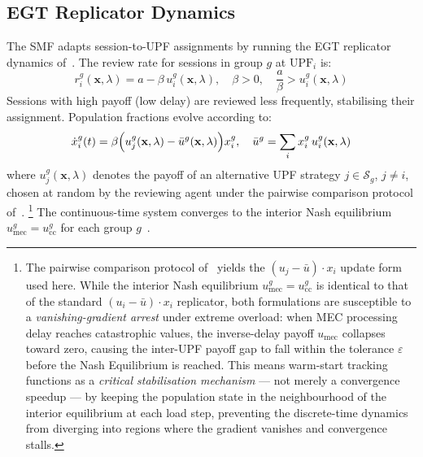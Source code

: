 \documentclass[conference]{IEEEtran}
\begin{document}
\subsection{EGT Replicator Dynamics}
\label{sec:egt}

The SMF adapts session-to-UPF assignments by running the
EGT replicator dynamics of~\cite{Alevizaki2021upf}.
The review rate for sessions in group $g$ at
$\text{UPF}_i$ is:
\begin{equation}
    r_i^g(\mathbf{x},\lambda) =
    a - \beta\,u_i^g(\mathbf{x},\lambda),
    \quad \beta > 0,\quad
    \frac{a}{\beta} > u_i^g(\mathbf{x},\lambda)
    \label{eq:revrate}
\end{equation}
Sessions with high payoff (low delay) are reviewed less
frequently, stabilising their assignment. Population
fractions evolve according to:
\begin{equation}
    \dot{x}_i^g(t) = \beta\Bigl(u_j^g(\mathbf{x},\lambda)
    - \bar{u}^g(\mathbf{x},\lambda)\Bigr)x_i^g, \quad
    \bar{u}^g = \sum_i x_i^g\,u_i^g(\mathbf{x},\lambda)
    \label{eq:replicator}
\end{equation}
where $u_j^g(\mathbf{x},\lambda)$ denotes the payoff of
an alternative UPF strategy $j \in \mathcal{S}_g$,
$j \neq i$, chosen at random by the reviewing agent
under the pairwise comparison protocol
of~\cite{Alevizaki2021upf}.
\footnote{The pairwise comparison protocol of~\cite{Alevizaki2021upf}
yields the $(u_j - \bar{u})\cdot x_i$ update form used here.
While the interior Nash equilibrium $u_\text{mec}^g = u_\text{cc}^g$
is identical to that of the standard $(u_i - \bar{u})\cdot x_i$
replicator, both formulations are susceptible to a
\emph{vanishing-gradient arrest} under extreme overload: when MEC
processing delay reaches catastrophic values, the inverse-delay
payoff $u_\text{mec}$ collapses toward zero, causing the inter-UPF
payoff gap to fall within the tolerance $\varepsilon$ before the
Nash Equilibrium is reached. This means warm-start tracking
functions as a \emph{critical stabilisation mechanism} --- not
merely a convergence speedup --- by keeping the population state
in the neighbourhood of the interior equilibrium at each load
step, preventing the discrete-time dynamics from diverging into
regions where the gradient vanishes and convergence stalls.}
The continuous-time system converges to the interior
Nash equilibrium $u_\text{mec}^g = u_\text{cc}^g$ for
each group $g$~\cite{Alevizaki2021upf}.
\end{document}
